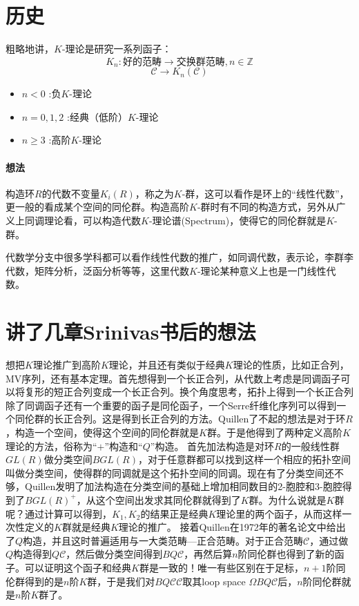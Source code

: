 \section{历史}
粗略地讲，$K$-理论是研究一系列函子：
\[K_n: \mbox{好的范畴} \longrightarrow \mbox{交换群范畴},n\in \mathbb{Z}\]
\[\mathcal{C}\longrightarrow K_n(\mathcal{C})\]
\begin{itemize}
	\item  $n<0$  :负$K$-理论
	\item  $n=0,1,2$ :经典（低阶）$K$-理论
	\item  $n\geq 3$ :高阶$K$-理论
\end{itemize}
\paragraph{想法}
构造环$R$的代数不变量$K_i(R)$，称之为$K$-群，这可以看作是环上的“线性代数”，更一般的看成某个空间的同伦群。构造高阶$K$-群时有不同的构造方式，另外从广义上同调理论看，可以构造代数$K$-理论谱(Spectrum)，使得它的同伦群就是$K$-群。

代数学分支中很多学科都可以看作线性代数的推广，如同调代数，表示论，李群李代数，矩阵分析，泛函分析等等，这里代数$K$-理论某种意义上也是一门线性代数。




\section{讲了几章Srinivas书后的想法}
想把$K$理论推广到高阶$K$理论，并且还有类似于经典$K$理论的性质，比如正合列，MV序列，还有基本定理。首先想得到一个长正合列，从代数上考虑是同调函子可以将复形的短正合列变成一个长正合列。换个角度思考，拓扑上得到一个长正合列除了同调函子还有一个重要的函子是同伦函子，一个Serre纤维化序列可以得到一个同伦群的长正合列。这是得到长正合列的方法。Quillen了不起的想法是对于环$R$，构造一个空间，使得这个空间的同伦群就是$K$群。于是他得到了两种定义高阶$K$理论的方法，俗称为“$+$”构造和“$Q$”构造。
首先加法构造是对环$R$的一般线性群$GL(R)$做分类空间$BGL(R)$，对于任意群都可以找到这样一个相应的拓扑空间叫做分类空间，使得群的同调就是这个拓扑空间的同调。现在有了分类空间还不够，Quillen发明了加法构造在分类空间的基础上增加相同数目的2-胞腔和3-胞腔得到了$BGL(R)^+$，从这个空间出发求其同伦群就得到了$K$群。为什么说就是$K$群呢？通过计算可以得到，$K_1,K_2$的结果正是经典$K$理论里的两个函子，从而这样一次性定义的$K$群就是经典$K$理论的推广。
接着Quillen在1972年的著名论文中给出了$Q$构造，并且这时普遍适用与一大类范畴---正合范畴。对于正合范畴$\mathcal{C}$，通过做$Q$构造得到$Q\mathcal{C}$，然后做分类空间得到$BQ\mathcal{C}$，再然后算$n$阶同伦群也得到了新的函子。可以证明这个函子和经典$K$群是一致的！唯一有些区别在于足标，$n+1$阶同伦群得到的是$n$阶$K$群，于是我们对$BQ\mathcal{C}\mathcal{C}$取其loop space $\Omega BQ\mathcal{C}$后，$n$阶同伦群就是$n$阶$K$群了。

